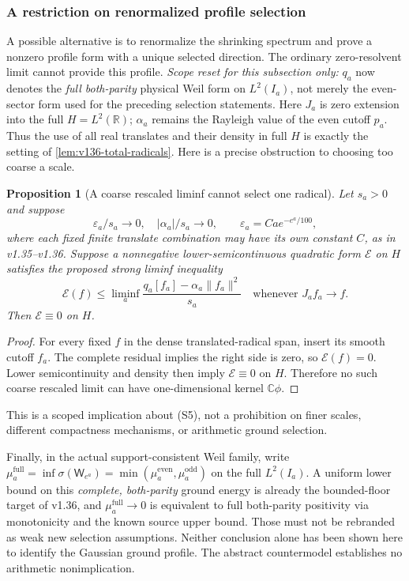 \documentclass[11pt]{article}
\newtheorem{proposition}[theorem]{Proposition}
\theoremstyle{remark}
\begin{document}
\subsubsection*{A restriction on renormalized profile selection}

A possible alternative is to renormalize the shrinking spectrum and
prove a nonzero profile form with a unique selected direction.
The ordinary zero-resolvent limit cannot provide this profile.
\emph{Scope reset for this subsection only:} $q_a$ now denotes the
\emph{full both-parity} physical Weil form on $L^2(I_a)$, not merely
the even-sector form used for the preceding selection statements.
Here $J_a$ is zero extension into the full $H=L^2(\mathbb R)$;
$\alpha_a$ remains the Rayleigh value of the even cutoff $p_a$.
Thus the use of all real translates and their density in full $H$
is exactly the setting of \ref{lem:v136-total-radicals}.
Here is a precise obstruction to choosing too coarse a scale.
\begin{proposition}[A coarse rescaled liminf cannot select one radical]
\label{prop:ns43-ccm-coarse-profile}
Let $s_a>0$ and suppose
\[
 \varepsilon_a/s_a\to0,\quad |\alpha_a|/s_a\to0,
 \qquad \varepsilon_a=Ca e^{-e^a/100},
\]
where each fixed finite translate combination may have its own constant
$C$, as in v1.35--v1.36. Suppose a nonnegative lower-semicontinuous
quadratic form $\mathcal E$ on $H$ satisfies the proposed strong
liminf inequality
\[
 \mathcal E(f)\le\liminf_a
 \frac{q_a[f_a]-\alpha_a\|f_a\|^2}{s_a}
 \quad\text{whenever }J_af_a\to f.
 \tag{S5}
\]
Then $\mathcal E\equiv0$ on $H$.
\end{proposition}
\begin{proof}
For every fixed $f$ in the dense translated-radical span, insert its
smooth cutoff $f_a$. The complete residual implies the right side is
zero, so $\mathcal E(f)=0$. Lower semicontinuity and density then imply
$\mathcal E\equiv0$ on $H$. Therefore no such coarse rescaled limit
can have one-dimensional kernel $\mathbb C\phi$.
\end{proof}
This is a scoped implication about (S5), not a prohibition on finer
scales, different compactness mechanisms, or arithmetic ground selection.

Finally, in the actual support-consistent Weil family, write
$\mu_a^{\mathrm{full}}=\inf\sigma(\mathsf W_{e^a})
=\min(\mu_a^{\mathrm{even}},\mu_a^{\mathrm{odd}})$ on the full
$L^2(I_a)$. A uniform lower bound on this \emph{complete, both-parity}
ground energy is already the bounded-floor
target of v1.36, and $\mu_a^{\mathrm{full}}\to0$ is equivalent to
full both-parity positivity
via monotonicity and the known source upper bound. Those must not be
rebranded as weak new selection assumptions. Neither conclusion alone
has been shown here to identify the Gaussian ground profile. The
abstract countermodel establishes no arithmetic nonimplication.
\end{document}
